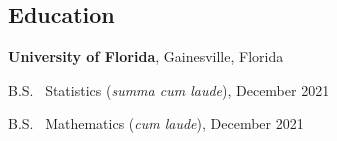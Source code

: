 \documentclass[margin,centered]{res}
\newenvironment{list1}{
  \begin{list}{\ding{113}}{%
      \setlength{\itemsep}{0in}
      \setlength{\parsep}{0in} \setlength{\parskip}{0in}
      \setlength{\topsep}{0in} \setlength{\partopsep}{0in}
      \setlength{\leftmargin}{0.17in}}}{\end{list}}
\newenvironment{list2}{
  \begin{list}{$\bullet$}{%
      \setlength{\itemsep}{0in}
      \setlength{\parsep}{0in} \setlength{\parskip}{0in}
      \setlength{\topsep}{0in} \setlength{\partopsep}{0in}
      \setlength{\leftmargin}{0.2in}}}{\end{list}}
\begin{document}
\begin{resume}











\section{\sc Education}



{\bf University of Florida}, Gainesville, Florida
\begin{list1}
\item[] B.S.~ Statistics (\textit{summa cum laude}), December 2021
\item[] B.S.~ Mathematics (\textit{cum laude}), December 2021
\end{list1}



\end{resume}
\end{document}
